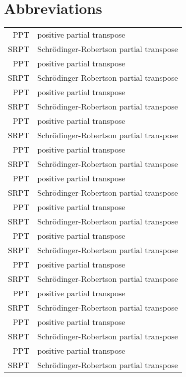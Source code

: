 \chapter*{Abbreviations}

\begin{longtable}{rl}
    PPT  & positive partial transpose                \\
    SRPT & Schr\"odinger-Robertson partial transpose \\
    PPT  & positive partial transpose                \\
    SRPT & Schr\"odinger-Robertson partial transpose \\
    PPT  & positive partial transpose                \\
    SRPT & Schr\"odinger-Robertson partial transpose \\
    PPT  & positive partial transpose                \\
    SRPT & Schr\"odinger-Robertson partial transpose \\
    PPT  & positive partial transpose                \\
    SRPT & Schr\"odinger-Robertson partial transpose \\
    PPT  & positive partial transpose                \\
    SRPT & Schr\"odinger-Robertson partial transpose \\
    PPT  & positive partial transpose                \\
    SRPT & Schr\"odinger-Robertson partial transpose \\
    PPT  & positive partial transpose                \\
    SRPT & Schr\"odinger-Robertson partial transpose \\
    PPT  & positive partial transpose                \\
    SRPT & Schr\"odinger-Robertson partial transpose \\
    PPT  & positive partial transpose                \\
    SRPT & Schr\"odinger-Robertson partial transpose \\
    PPT  & positive partial transpose                \\
    SRPT & Schr\"odinger-Robertson partial transpose \\
    PPT  & positive partial transpose                \\
    SRPT & Schr\"odinger-Robertson partial transpose \\

\end{longtable}
